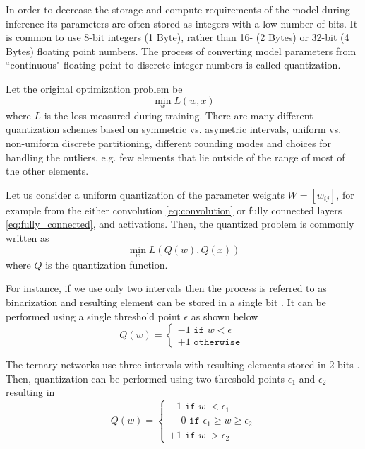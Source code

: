 \documentclass{article}
\begin{document}
In order to decrease the storage and compute requirements of the model during inference its parameters are often stored as integers with a low number of bits. It is common to use 8-bit integers (1 Byte), rather than 16- (2 Bytes) or 32-bit (4 Bytes) floating point numbers. The process of converting model parameters from ``continuous" floating point to discrete integer numbers is called quantization.

Let the original optimization problem be
\begin{equation}
\min_w L(w,x)
\label{eq:orig}
\end{equation}
where $L$ is the loss measured during training. There are many different quantization schemes based on symmetric vs. asymetric intervals, uniform vs. non-uniform discrete partitioning, different rounding modes and choices for handling the outliers, e.g. few elements that lie outside of the range of most of the other elements. 

Let us consider a uniform quantization of the parameter weights $W = [w_{ij}]$, for example from the either convolution \eqref{eq:convolution} or fully connected layers \eqref{eq:fully_connected}, and activations. Then, the quantized problem is commonly written as
\begin{equation}
\min_w L(Q(w),Q(x))
\label{eq:quant}
\end{equation}
where $Q$ is the quantization function.

For instance, if we use only two intervals then the process is referred to as binarization and resulting element can be stored in a single bit \cite{Courbariaux2015,Courbariaux2016,Hubara2016,Rastegari2016}. It can be performed using a single threshold point $\epsilon$ as shown below
\begin{equation}
Q(w) = \left\{ \begin{array}{l} -1 \texttt{ if } w < \epsilon \\ +1 \texttt{ otherwise }  \end{array} \right.
\label{eq:binary}
\end{equation}

The ternary networks use three intervals with resulting elements stored in 2 bits \cite{Li2016,Mellempudi2017,Choi2018}. Then, quantization can be performed using two threshold points $\epsilon_1$ and $\epsilon_2$ resulting in
\begin{equation}
Q(w) = \left\{ \begin{array}{l} -1 \texttt{ if } w\phantom{|} < \epsilon_1 \\ \phantom{-}0 \texttt{ if } \epsilon_1 \ge w \ge \epsilon_2 \\ +1 \texttt{ if } w\phantom{|} > \epsilon_2 \end{array} \right.
\label{eq:ternary}
\end{equation}
\end{document}
